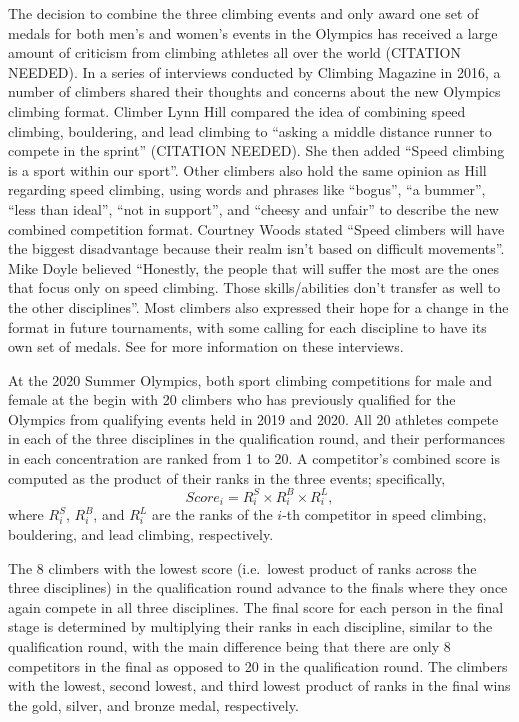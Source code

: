 \documentclass[12pt]{article}
\begin{document}
The decision to combine the three climbing events and only award one set
of medals for both men's and women's events in the Olympics has received
a large amount of criticism from climbing athletes all over the world
(CITATION NEEDED). In a series of interviews conducted by Climbing
Magazine in 2016, a number of climbers shared their thoughts and
concerns about the new Olympics climbing format. Climber Lynn Hill
compared the idea of combining speed climbing, bouldering, and lead
climbing to ``asking a middle distance runner to compete in the sprint''
(CITATION NEEDED). She then added ``Speed climbing is a sport within our
sport''. Other climbers also hold the same opinion as Hill regarding
speed climbing, using words and phrases like ``bogus'', ``a bummer'',
``less than ideal'', ``not in support'', and ``cheesy and unfair'' to
describe the new combined competition format. Courtney Woods stated
``Speed climbers will have the biggest disadvantage because their realm
isn't based on difficult movements''. Mike Doyle believed ``Honestly,
the people that will suffer the most are the ones that focus only on
speed climbing. Those skills/abilities don't transfer as well to the
other disciplines''. Most climbers also expressed their hope for a
change in the format in future tournaments, with some calling for each
discipline to have its own set of medals. See \citet{blanchard2016} for
more information on these interviews.

At the 2020 Summer Olympics, both sport climbing competitions for male
and female at the begin with 20 climbers who has previously qualified
for the Olympics from qualifying events held in 2019 and 2020. All 20
athletes compete in each of the three disciplines in the qualification
round, and their performances in each concentration are ranked from 1 to
20. A competitor's combined score is computed as the product of their
ranks in the three events; specifically, \begin{equation}
Score_i = R^S_i\times R^B_i\times R^L_i,
\end{equation} where \(R^S_i\), \(R^B_i\), and \(R^L_i\) are the ranks
of the \(i\)-th competitor in speed climbing, bouldering, and lead
climbing, respectively.

The 8 climbers with the lowest score (i.e.~lowest product of ranks
across the three disciplines) in the qualification round advance to the
finals where they once again compete in all three disciplines. The final
score for each person in the final stage is determined by multiplying
their ranks in each discipline, similar to the qualification round, with
the main difference being that there are only 8 competitors in the final
as opposed to 20 in the qualification round. The climbers with the
lowest, second lowest, and third lowest product of ranks in the final
wins the gold, silver, and bronze medal, respectively.
\end{document}
